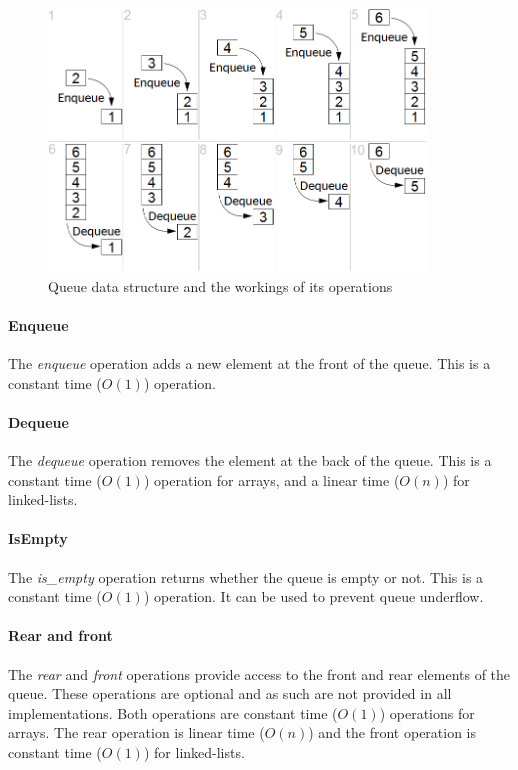 \documentclass{article}
\begin{document}
{\begin{figure}[H]
  \centering
  \includegraphics[width=10cm]{queue}
  \caption{Queue data structure and the workings of its operations}
\end{figure}

\paragraph{Enqueue}
The {\em enqueue} operation adds a new element at the front of the queue.
This is a constant time (\(O(1)\)) operation.

\paragraph{Dequeue}
The {\em dequeue} operation removes the element at the back of the queue.
This is a constant time (\(O(1)\)) operation for arrays, and a linear time (\(O(n)\)) for linked-lists.

\paragraph{IsEmpty}
The {\em is\_empty} operation returns whether the queue is empty or not.
This is a constant time (\(O(1)\)) operation. It can be used to prevent queue underflow.

\paragraph{Rear and front}
The {\em rear} and {\em front} operations provide access to the front and rear elements of the queue.
These operations are optional and as such are not provided in all implementations. Both operations are
constant time (\(O(1)\)) operations for arrays. The rear operation is linear time (\(O(n)\)) and the
front operation is constant time (\(O(1)\)) for linked-lists.

}
\end{document}
